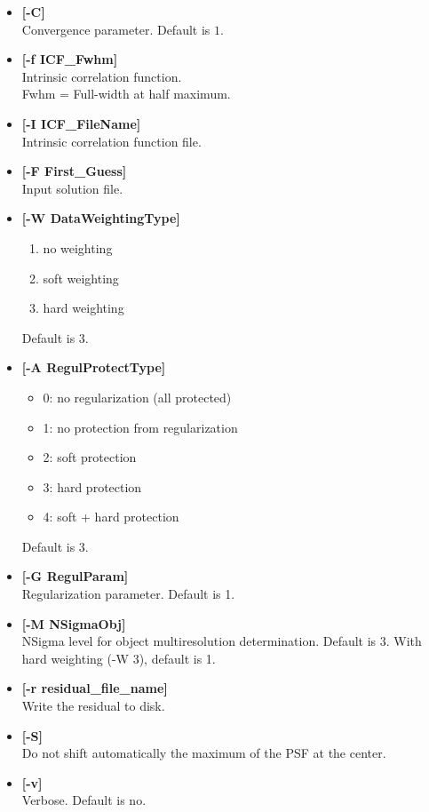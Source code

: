 \begin{itemize}
\item {\bf [-C]} \\
Convergence parameter.
Default is $1$.
\item {\bf  [-f ICF\_Fwhm]} \\
Intrinsic correlation function. \\
Fwhm = Full-width at half maximum.
\item {\bf [-I ICF\_FileName]} \\
Intrinsic correlation function file.
\item {\bf [-F First\_Guess]} \\
Input solution file.
\item {\bf [-W DataWeightingType]} 
\begin{enumerate}
\baselineskip=0.4truecm
\item no weighting 
\item soft weighting
\item hard weighting 
\end{enumerate}
Default is 3.
\item {\bf [-A RegulProtectType]}
\begin{itemize}
\baselineskip=0.4truecm
\itemsep=0.1truecm
\item{0: } no regularization (all protected) 
\item{1: } no protection from regularization 
\item{2: } soft protection 
\item{3: } hard protection 
\item{4: } soft + hard protection 
\end{itemize}
Default is 3.
\item {\bf [-G RegulParam]} \\
Regularization parameter. Default is 1.
\item {\bf [-M NSigmaObj]} \\
NSigma level for object multiresolution determination.
Default is 3. With hard weighting (-W 3), default is 1.

\item {\bf [-r residual\_file\_name]} \\
 Write the residual to disk. 
\item {\bf [-S]} \\
Do not shift automatically the maximum of the PSF at the center.
\item {\bf [-v]} \\
Verbose. Default is no.
\end{itemize}
